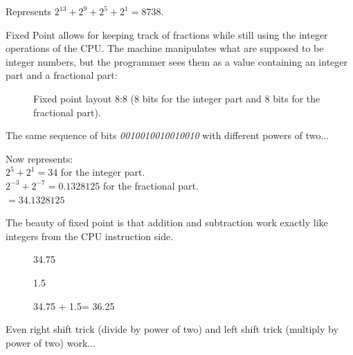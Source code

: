 Represents $ 2^{13} + 2^9 + 2^5 + 2^1 =  8738 $.\\
 \par

Fixed Point allows for keeping track of fractions while still using the integer operations of the CPU. The machine manipulates what are supposed to be integer numbers, but the programmer sees them as a value containing an integer part and a fractional part:\\
\par
\begin{figure}[H]
 \centering
  
 \caption{Fixed point layout 8:8 (8 bits for the integer part and 8 bits for the fractional part).} \label{fig:mips}
\end{figure}

The same sequence of bits \emph{0010010010010010} with different powers of two...
\begin{figure}[H]
 \centering
   
\end{figure} 

Now represents:\\

$ 2^5 + 2^1 = 34 $ for the integer part.\\
$ 2^{-3}+2^{-7} = 0.1328125 $ for the fractional part.\\
$ = 34.1328125$\\

\bigskip

The beauty of fixed point is that addition and subtraction work exactly like integers from the CPU instruction side.\\




\par
\begin{figure}[H]
 \centering
   

   \caption{34.75} 
\end{figure} 

\begin{figure}[H]
 \centering
   
  \caption{1.5} 
\end{figure} 

\begin{figure}[H]
 \centering
   
  {\caption{34.75 + 1.5= 36.25}}
\end{figure} 
\par
 Even right shift trick (divide by power of two) and left shift trick (multiply by power of two) work...\\
 
